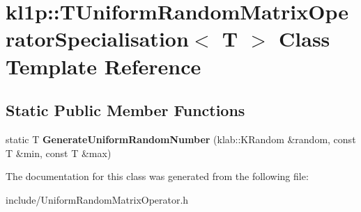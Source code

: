 \hypertarget{classkl1p_1_1TUniformRandomMatrixOperatorSpecialisation}{}\section{kl1p\+:\+:T\+Uniform\+Random\+Matrix\+Operator\+Specialisation$<$ T $>$ Class Template Reference}
\label{classkl1p_1_1TUniformRandomMatrixOperatorSpecialisation}
\subsection*{Static Public Member Functions}
\begin{DoxyCompactItemize}
\item 
static T {\bfseries Generate\+Uniform\+Random\+Number} (klab\+::\+K\+Random \&random, const T \&min, const T \&max)\hypertarget{classkl1p_1_1TUniformRandomMatrixOperatorSpecialisation_afbf7f0c204b0f685b5538b1339015332}{}\label{classkl1p_1_1TUniformRandomMatrixOperatorSpecialisation_afbf7f0c204b0f685b5538b1339015332}

\end{DoxyCompactItemize}


The documentation for this class was generated from the following file\+:\begin{DoxyCompactItemize}
\item 
include/Uniform\+Random\+Matrix\+Operator.\+h\end{DoxyCompactItemize}
